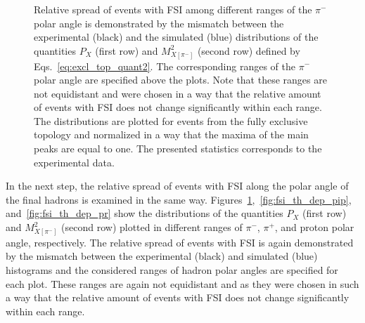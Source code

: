 \begin{figure}[!ht]
\begin{center}
\end{center}
\caption{\small Relative spread of events with FSI among different ranges of the $\pi^{-}$ polar angle is demonstrated by the mismatch between the experimental (black) and the simulated (blue) distributions of the quantities $P_{X}$ (first row) and $M^{2}_{X[\pi^{-}]}$ (second row) defined by Eqs.~\eqref{eq:excl_top_quant2}. The corresponding ranges of the $\pi^{-}$ polar angle are specified above the plots. Note that these ranges are not equidistant and were chosen in a way that the relative amount of events with FSI does not change significantly within each range. The distributions are plotted for events from the fully exclusive topology and normalized in a way that the maxima of the main peaks are equal to one. The presented statistics corresponds to the experimental data.}
\label{fig:fsi_th_dep_pim}
\end{figure}

In the next step, the relative spread of events with FSI along the polar angle of the final hadrons is examined in the same way. Figures~\ref{fig:fsi_th_dep_pim},~\ref{fig:fsi_th_dep_pip}, and~\ref{fig:fsi_th_dep_pr} show the distributions of the quantities $P_{X}$ (first row) and $M^{2}_{X[\pi^{-}]}$ (second row) plotted in different ranges of $\pi^{-}$, $\pi^{+}$, and proton polar angle, respectively. The relative spread of events with FSI is again demonstrated by the mismatch between the experimental (black) and simulated (blue) histograms and the considered ranges of hadron polar angles are specified for each plot. These ranges are again not equidistant and as they were chosen in such a way that the relative amount of events with FSI does not change significantly within each range. %

